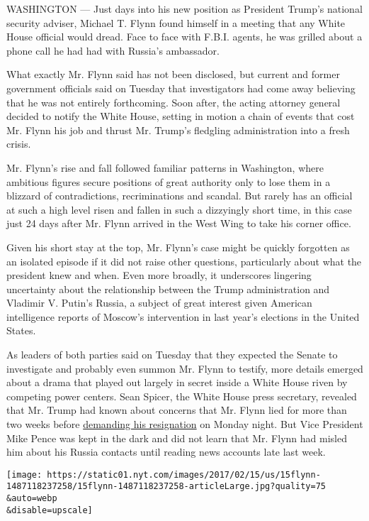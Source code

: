 WASHINGTON --- Just days into his new position as President Trump's
national security adviser, Michael T. Flynn found himself in a meeting
that any White House official would dread. Face to face with F.B.I.
agents, he was grilled about a phone call he had had with Russia's
ambassador.

What exactly Mr. Flynn said has not been disclosed, but current and
former government officials said on Tuesday that investigators had come
away believing that he was not entirely forthcoming. Soon after, the
acting attorney general decided to notify the White House, setting in
motion a chain of events that cost Mr. Flynn his job and thrust Mr.
Trump's fledgling administration into a fresh crisis.

Mr. Flynn's rise and fall followed familiar patterns in Washington,
where ambitious figures secure positions of great authority only to lose
them in a blizzard of contradictions, recriminations and scandal. But
rarely has an official at such a high level risen and fallen in such a
dizzyingly short time, in this case just 24 days after Mr. Flynn arrived
in the West Wing to take his corner office.

Given his short stay at the top, Mr. Flynn's case might be quickly
forgotten as an isolated episode if it did not raise other questions,
particularly about what the president knew and when. Even more broadly,
it underscores lingering uncertainty about the relationship between the
Trump administration and Vladimir V. Putin's Russia, a subject of great
interest given American intelligence reports of Moscow's intervention in
last year's elections in the United States.

As leaders of both parties said on Tuesday that they expected the Senate
to investigate and probably even summon Mr. Flynn to testify, more
details emerged about a drama that played out largely in secret inside a
White House riven by competing power centers. Sean Spicer, the White
House press secretary, revealed that Mr. Trump had known about concerns
that Mr. Flynn lied for more than two weeks before
\href{https://www.nytimes.com/2017/02/13/us/politics/donald-trump-national-security-adviser-michael-flynn.html}{demanding
his resignation} on Monday night. But Vice President Mike Pence was kept
in the dark and did not learn that Mr. Flynn had misled him about his
Russia contacts until reading news accounts late last week.

\texttt{[image: https://static01.nyt.com/images/2017/02/15/us/15flynn-1487118237258/15flynn-1487118237258-articleLarge.jpg?quality=75\\\&auto=webp\\\&disable=upscale]}

